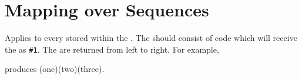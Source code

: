 \documentclass[oneside]{book}
\begin{document}
\section{Mapping over Sequences}



\begin{function}{\SeqVarMapInline}
\begin{syntax}
  
\end{syntax}
Applies  to every  stored
within the . The  should
consist of code which will receive the  as \verb|#1|.
The  are returned from left to right. For example,
\begin{codehigh}
\IgnoreSpacesOn
\SeqSetFromClist {}
\TlClear \lTmpaTl
\SeqVarMapInline {}
\Result {\TlUse\lTmpaTl}
\IgnoreSpacesOff
\end{codehigh}
produces (one)(two)(three).
\end{function}

\end{document}

